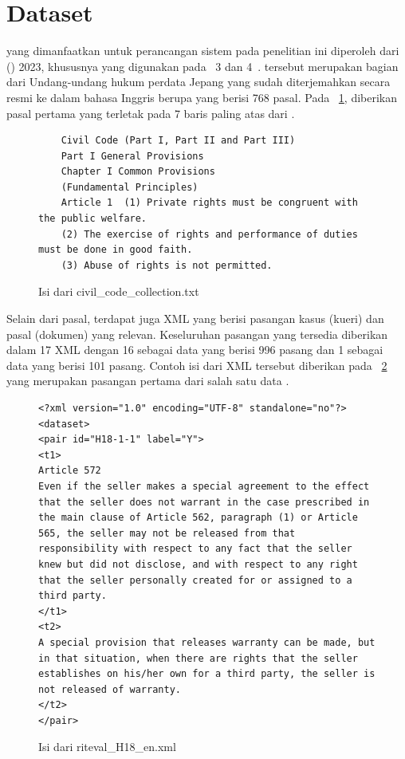 \section{Dataset}
\label{subbab:3:Dataset}
\Dataset{} yang dimanfaatkan untuk perancangan sistem \ir{} pada penelitian ini diperoleh dari \coliee{} (\COLIEE{}) 2023, khususnya \dataset{} yang digunakan pada \task{}~3 dan 4~\citep{goebel2023summary}. \Dataset{} tersebut merupakan bagian dari Undang-undang hukum perdata Jepang yang sudah diterjemahkan secara resmi ke dalam bahasa Inggris berupa \txt{} \file{} yang berisi 768 pasal. Pada \gambar{}~\ref{gambar:TextFile}, diberikan pasal pertama yang terletak pada 7 baris paling atas dari \file{} \txt{}.
\begin{figure}[!ht]
    \centering
    \begin{lstlisting}
    Civil Code (Part I, Part II and Part III)
    Part I General Provisions
    Chapter I Common Provisions
    (Fundamental Principles)
    Article 1  (1) Private rights must be congruent with the public welfare.
    (2) The exercise of rights and performance of duties must be done in good faith.
    (3) Abuse of rights is not permitted.\end{lstlisting}
    \caption{Isi dari \file{} civil\_code\_collection.txt}
    \label{gambar:TextFile}
\end{figure}

Selain dari \file{} pasal, terdapat juga \file{} XML yang berisi pasangan kasus (kueri) dan pasal (dokumen) yang relevan. Keseluruhan pasangan yang tersedia diberikan dalam 17 XML \file{} dengan 16 \file{} sebagai data \training{} yang berisi 996 pasang dan 1 \file{} sebagai data \testing{} yang berisi 101 pasang. Contoh isi dari \file{} XML tersebut diberikan pada \gambar{}~\ref{gambar:XMLFile} yang merupakan pasangan pertama dari salah satu \file{} data \training{}.
\begin{figure}[!ht]
    \centering
    \begin{lstlisting}
<?xml version="1.0" encoding="UTF-8" standalone="no"?>
<dataset>
<pair id="H18-1-1" label="Y">
<t1>
Article 572
Even if the seller makes a special agreement to the effect that the seller does not warrant in the case prescribed in the main clause of Article 562, paragraph (1) or Article 565, the seller may not be released from that responsibility with respect to any fact that the seller knew but did not disclose, and with respect to any right that the seller personally created for or assigned to a third party.
</t1>
<t2>
A special provision that releases warranty can be made, but in that situation, when there are rights that the seller establishes on his/her own for a third party, the seller is not released of warranty.
</t2>
</pair>\end{lstlisting}
    \caption{Isi dari \file{} riteval\_H18\_en.xml}
    \label{gambar:XMLFile}
\end{figure}


